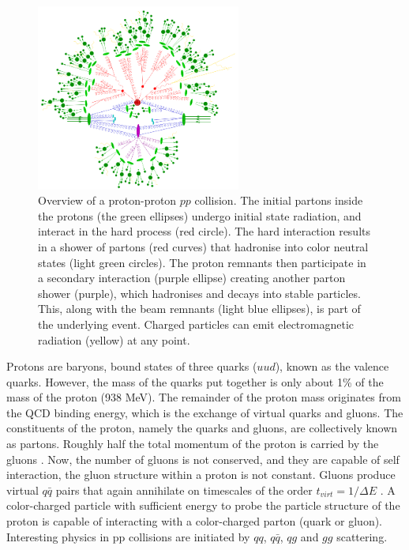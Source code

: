 \documentclass[12pt,a4paper,openright,twoside]{report}
\begin{document}
\begin{figure}
\centering
\includegraphics[width=0.6\textwidth]{pp-shower.png}
\caption{Overview of a proton-proton $pp$ collision. The initial partons inside the protons (the green ellipses) undergo initial state radiation, and interact in the hard process (red circle). The hard interaction results in a shower of partons (red curves) that hadronise into color neutral states (light green circles). The proton remnants then participate in a secondary interaction (purple ellipse) creating another parton shower (purple), which hadronises and decays into stable particles. This, along with the beam remnants (light blue ellipses), is part of the underlying event. Charged particles can emit electromagnetic radiation (yellow) at any point.}
\label{fig:pp}
\end{figure}

Protons are baryons, bound states of three quarks ($uud$), known as the valence quarks.  However, the mass of the quarks put together is only about 1\% of the mass of the proton (938 MeV). The remainder of the proton mass originates from the QCD binding energy, which is the exchange of virtual quarks and gluons. The constituents of the proton, namely the quarks and gluons, are collectively known as partons. Roughly half the total momentum of the proton is carried by the gluons \cite{quarks_and_leptons}. Now, the number of gluons is not conserved, and they are capable of self interaction, the gluon structure within a proton is not constant. Gluons produce virtual $q\bar{q}$ pairs that again annihilate on timescales of the order $t_{virt}=1/\Delta E$ \cite{collider_physics}. A color-charged particle with sufficient energy to probe the particle structure of the proton is capable of interacting with a color-charged parton (quark or gluon). Interesting physics in pp collisions are initiated by $qq$, $q\bar{q}$, $qg$ and $gg$ scattering.
\end{document}
